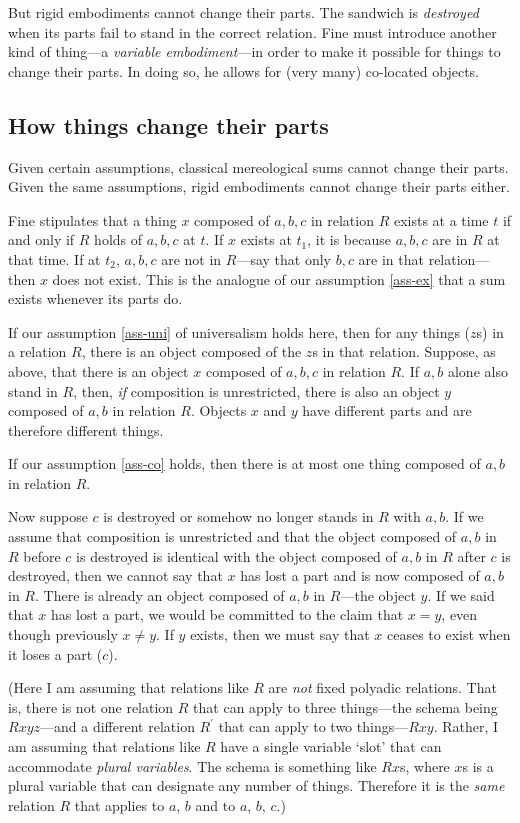 \documentclass[11pt]{article}
\begin{document}
\begin{spacing}{1.5}
But rigid embodiments cannot change their parts.  The sandwich is {\em
  destroyed} when its parts fail to stand in the correct relation.
Fine must introduce another kind of thing---a {\em variable
  embodiment}---in order to make it possible for things to change
their parts.  In doing so, he allows for (very many) co-located
objects.

\subsection{How things change their parts}
\label{h-part}
Given certain assumptions, classical mereological sums cannot change
their parts.  Given the same assumptions, rigid embodiments cannot
change their parts either.

Fine stipulates that a thing $x$ composed of $a, b, c$ in relation $R$
exists at a time $t$ if and only if $R$ holds of $a, b, c$ at $t$.  If
$x$ exists at $t_1$, it is because $a, b, c$ are in $R$ at that time.
If at $t_2$, $a, b, c$ are not in $R$---say that only $b, c$ are in
that relation---then $x$ does not exist.  This is the analogue of our
assumption \ref{ass-ex} that a sum exists whenever its parts do.

If our assumption \ref{ass-uni} of universalism holds here, then for
any things ($z$s) in a relation $R$, there is an object composed of
the $z$s in that relation.  Suppose, as above, that there is an object
$x$ composed of $a, b, c$ in relation $R$.  If $a, b$ alone also stand
in $R$, then, {\em if} composition is unrestricted, there is also an
object $y$ composed of $a, b$ in relation $R$.  Objects $x$ and $y$
have different parts and are therefore different things.

If our assumption \ref{ass-co} holds, then there is at most one thing
composed of $a, b$ in relation $R$.

Now suppose $c$ is destroyed or somehow no longer stands in $R$ with
$a, b$.  If we assume that composition is unrestricted and that the
object composed of $a, b$ in $R$ before $c$ is destroyed is identical
with the object composed of $a, b$ in $R$ after $c$ is destroyed, then
we cannot say that $x$ has lost a part and is now composed of $a, b$
in $R$.  There is already an object composed of $a, b$ in $R$---the
object $y$.  If we said that $x$ has lost a part, we would be
committed to the claim that $x = y$, even though previously $x \neq
y$.  If $y$ exists, then we must say that $x$ ceases to exist when it
loses a part ($c$).

(Here I am assuming that relations like $R$ are {\em not} fixed
polyadic relations.  That is, there is not one relation $R$ that can
apply to three things---the schema being $Rxyz$---and a different
relation $R^{\prime}$ that can apply to two things---$Rxy$.  Rather, I
am assuming that relations like $R$ have a single variable `slot' that
can accommodate {\em plural variables}.  The schema is something like
$Rx$s, where $x$s is a plural variable that can designate any number
of things.  Therefore it is the {\em same} relation $R$ that applies
to $a$, $b$ and to $a$, $b$, $c$.)


\end{spacing}
\end{document}

